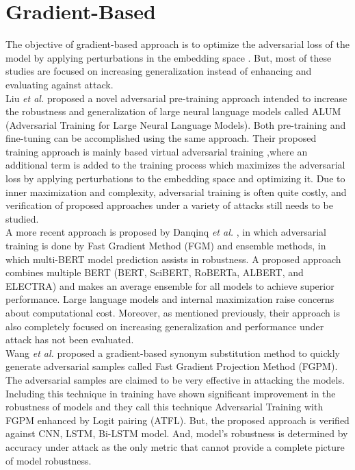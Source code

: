 \documentclass[%
	BCOR=8mm, %
	DIV=12,
	toc=bibliography, %
	toc=listof, %
	oneside, %
	egregdoesnotlikesansseriftitles, %
	]{scrbook}
\begin{document}
\section{Gradient-Based }
\label{section:GradBasedAdvTra}
The objective of gradient-based approach is to optimize the adversarial loss of the model by applying perturbations in the embedding space \cite{liu_adversarial_2020,goodfellow_explaining_2015,zhu_at-bert_2021,miyato_adversarial_2017,jiang_smart_2020-1}.  But, most of these studies are focused on increasing generalization instead of enhancing and evaluating against attack.\\
 Liu \textit{et al.} \cite{liu_adversarial_2020} proposed a novel adversarial pre-training approach intended to increase the robustness and generalization of large neural language models called ALUM (Adversarial Training for Large Neural Language Models). Both pre-training and fine-tuning can be accomplished using the same approach. Their proposed training approach is mainly based virtual adversarial training \cite{miyato_virtual_2018},where an additional term is added to the training process which maximizes the adversarial loss by applying perturbations to the embedding space and optimizing it. Due to inner maximization and complexity, adversarial training is often quite costly, and verification of proposed approaches under a variety of attacks still needs to be studied.\\
A more recent approach is proposed by Danqinq \textit{et al.} \cite{zhu_at-bert_2021}, in which adversarial training is done by Fast Gradient Method (FGM) \cite{miyato_adversarial_2017} and ensemble methods, in which multi-BERT model prediction assists in robustness. A proposed approach combines multiple BERT (BERT, SciBERT, RoBERTa, ALBERT, and ELECTRA) and makes an average ensemble for all models to achieve superior performance. Large language models and internal maximization raise concerns about computational cost. Moreover, as mentioned previously, their approach is also completely focused on increasing generalization and performance under attack has not been evaluated.\\
Wang \textit{et al.} \cite{wang_adversarial_2021-1} proposed a gradient-based synonym substitution method to quickly generate adversarial samples called Fast Gradient Projection Method (FGPM). The adversarial samples are claimed to be very effective in attacking the models. Including this technique in training have shown significant improvement in the robustness of models and they call this technique Adversarial Training with FGPM enhanced by Logit pairing (ATFL). But, the proposed approach is verified against CNN, LSTM, Bi-LSTM model. And, model's robustness is determined by accuracy under attack as the only metric that cannot provide a complete picture of model robustness.
\end{document}
